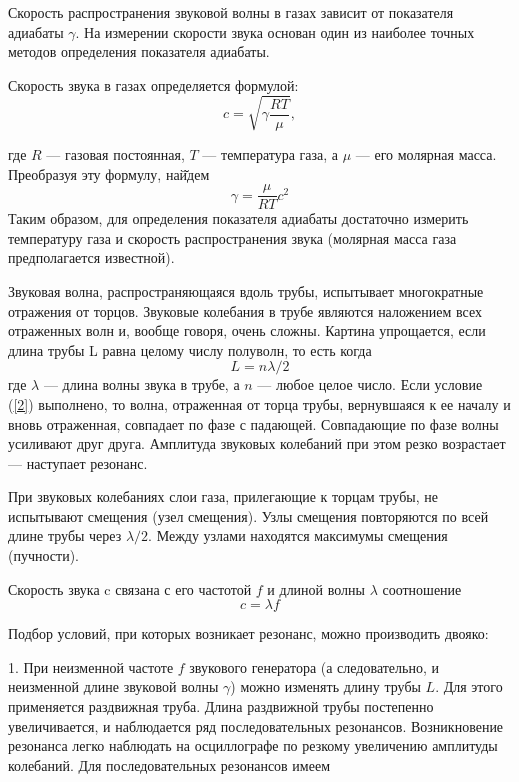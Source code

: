 \documentclass[12pt]{article}
\begin{document}
Скорость распространения звуковой волны в газах зависит от показателя адиабаты $\gamma$. На измерении скорости звука основан один из наиболее точных методов определения показателя адиабаты.

Скорость звука в газах определяется формулой:
$$ c = \sqrt{\gamma\frac{RT}{\mu}},$$

где $R$ — газовая постоянная, $T$ — температура газа, а $\mu$ — его молярная масса. 
\newpage
Преобразуя эту формулу, най̆дем
\begin{equation}\label{1}
    \gamma = \frac{\mu}{RT}c^2 
\end{equation}
Таким образом, для определения показателя адиабаты достаточно измерить температуру газа и скорость распространения звука (молярная масса газа предполагается известной).

Звуковая волна, распространяющаяся вдоль трубы, испытывает многократные отражения от торцов. Звуковые колебания в трубе являются наложением всех отраженных волн и, вообще говоря, очень сложны. Картина упрощается, если длина трубы L равна целому числу полуволн, то есть когда
\begin{equation}\label{2}
    L = n\lambda/2
\end{equation}
где $\lambda$ — длина волны звука в трубе, а $n$ — любое целое число. Если условие (\ref{2}) выполнено, то волна, отраженная от торца трубы, вернувшаяся к ее началу и вновь отраженная, совпадает по фазе с падающей. Совпадающие по фазе волны усиливают друг друга. Амплитуда звуковых колебаний при этом резко возрастает — наступает резонанс.

При звуковых колебаниях слои газа, прилегающие к торцам трубы, не испытывают смещения (узел смещения). Узлы смещения повторяются по всей длине трубы через $\lambda/2$. Между узлами находятся максимумы смещения (пучности).

Скорость звука c связана с его частотой $f$ и длиной волны $\lambda$ соотношение
\begin{equation}\label{3}
    c = \lambda{f}
\end{equation}

Подбор условий, при которых возникает резонанс, можно производить двояко:

\newpage

1. При неизменной частоте $f$ звукового генератора (а следовательно, и неизменной длине звуковой волны $\gamma$) можно изменять длину трубы $L$. Для этого применяется раздвижная труба. Длина раздвижной трубы постепенно увеличивается, и наблюдается ряд последовательных резонансов. Возникновение резонанса легко наблюдать на осциллографе по резкому увеличению амплитуды колебаний. Для последовательных резонансов имеем
\end{document}
